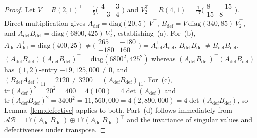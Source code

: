 \documentclass[11pt,a4paper]{article}
\theoremstyle{definition}
\newcommand{\diag}{\mathrm{diag}}
\newcommand{\tr}{\mathrm{tr}}
\begin{document}
\begin{proof}
Let $V = R(2, 1)^\top = \frac{1}{5}\bigl(\begin{smallmatrix} 4 & 3 \\ -3 & 4 \end{smallmatrix}\bigr)$ and $V_2^\top = R(4, 1) = \frac{1}{17}\bigl(\begin{smallmatrix} 8 & -15 \\ 15 & 8 \end{smallmatrix}\bigr)$. Direct multiplication gives $A_{\mathrm{def}} = \diag(20, 5)\,V^\top$, $B_{\mathrm{def}} = V\,\diag(340, 85)\,V_2^\top$, and $A_{\mathrm{def}} B_{\mathrm{def}} = \diag(6800, 425)\,V_2^\top$, establishing~(a). For~(b), $A_{\mathrm{def}} A_{\mathrm{def}}^\top = \diag(400, 25) \ne \bigl(\begin{smallmatrix} 265 & -180 \\ -180 & 160 \end{smallmatrix}\bigr) = A_{\mathrm{def}}^\top A_{\mathrm{def}}$, $B_{\mathrm{def}}^\top B_{\mathrm{def}} \ne B_{\mathrm{def}} B_{\mathrm{def}}^\top$, $(A_{\mathrm{def}} B_{\mathrm{def}})(A_{\mathrm{def}} B_{\mathrm{def}})^\top = \diag(6800^2, 425^2)$ whereas $(A_{\mathrm{def}} B_{\mathrm{def}})^\top (A_{\mathrm{def}} B_{\mathrm{def}})$ has $(1,2)$-entry $-19{,}125{,}000 \ne 0$, and $(B_{\mathrm{def}} A_{\mathrm{def}})_{11} = 2120 \ne 3200 = (A_{\mathrm{def}} B_{\mathrm{def}})_{11}$. For~(c), $\tr(A_{\mathrm{def}})^2 = 20^2 = 400 = 4(100) = 4\det(A_{\mathrm{def}})$ and $\tr(A_{\mathrm{def}} B_{\mathrm{def}})^2 = 3400^2 = 11{,}560{,}000 = 4(2{,}890{,}000) = 4\det(A_{\mathrm{def}} B_{\mathrm{def}})$, so Lemma~\ref{lem:defective} applies to both. Part~(d) follows immediately from $\mathcal{A}\mathcal{B} = 17(A_{\mathrm{def}} B_{\mathrm{def}}) \oplus 17(A_{\mathrm{def}} B_{\mathrm{def}})^\top$ and the invariance of singular values and defectiveness under transpose.
\end{proof}
\end{document}
